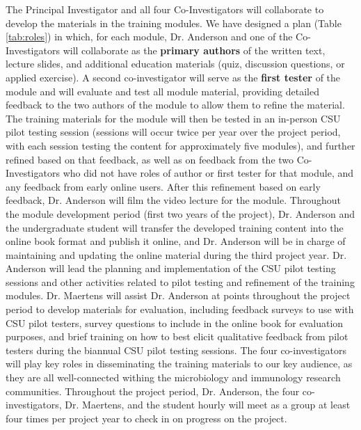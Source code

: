 \documentclass[pdftex,english,11pt,parskip=half]{scrartcl}
\begin{document}
The Principal Investigator and all four Co-Investigators will collaborate to 
develop the materials in the training modules. We have designed a plan (Table \ref{tab:roles}) in which, for each module, Dr. Anderson and one of the Co-Investigators will collaborate as the \textbf{primary authors} of the written text, lecture slides, and additional education materials (quiz, discussion questions, or applied exercise). A second co-investigator will serve as the \textbf{first tester} of the module and will evaluate and test all module material, providing detailed feedback to the two authors of the module to allow them to refine the material. The training materials for the module will then be tested in an in-person CSU pilot testing session (sessions will occur twice per year over the project period, with each session testing the content for approximately five modules), and further refined based on that feedback, as well as on feedback from the two Co-Investigators who did not have roles of author or first tester for that module, and any feedback from early online users. After this refinement based on early feedback, Dr. Anderson will film the video lecture for the module.  
Throughout the module development period (first two years of the project), Dr. Anderson and the undergraduate student will transfer the developed training content into the online book format and publish it online, and Dr. Anderson will be in charge of maintaining and updating the online material during the third project year. Dr. Anderson will lead the planning and implementation of the CSU pilot testing sessions and other activities related to pilot testing and refinement of the training modules. Dr. Maertens will assist Dr. Anderson at points throughout the project period to develop materials for evaluation, including feedback surveys to use with CSU pilot testers, survey questions to include in the online book for evaluation purposes, and brief training on how to best elicit qualitative feedback from pilot testers during the biannual CSU pilot testing sessions. The four co-investigators will play key roles in disseminating the training materials to our key audience, as they are all well-connected withing the microbiology and immunology research communities. Throughout the project period, Dr. Anderson, the four co-investigators, Dr. Maertens, and the student hourly will meet as a group at least four times per project year to check in on progress on the project. 
\end{document}
